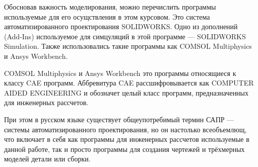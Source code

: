 Обосновав важность моделирования,
можно перечислить программы используемые для его осущствления в этом курсовом.
Это система автоматизированного проектирования SOLIDWORKS.
Одно из дополнений (Add-Ins) используемое для симцуляций в этой программе — SOLIDWORKS Simulation.
Также использовались такие программы как COMSOL Multiphysics и Ansys Workbench.

COMSOL Multiphysics и Ansys Workbench это программы относящиеся к классу CAE программ.
Аббревитура CAE рассшифровывается как COMPUTER AIDED ENGINEERING и обозначет целый класс программ,
предназначенных для инженерных рассчетов.

При этом в русском языке существует общеупотребимый термин САПР — системы автоматизированного проектирования,
но он настолько всеобъемлющ, что включает в себя как программы для инженерных рассчетов используемые в данной работе,
так и просто программы для создания чертежей и трёхмерных моделей детали или сборки.

